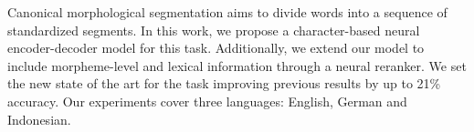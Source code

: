 Canonical morphological segmentation aims to divide words into a sequence of standardized segments. In this work, we propose a character-based neural encoder-decoder model for this task. Additionally, we extend our model to include morpheme-level and lexical information through a neural reranker. We set the new state of the art for the task improving previous results by up to 21\% accuracy. Our experiments cover three languages: English, German and Indonesian.
